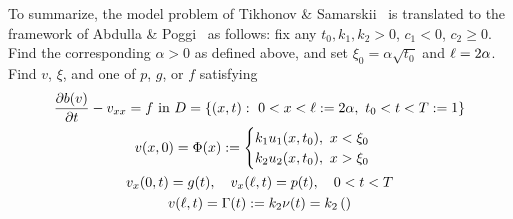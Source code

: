 To summarize, the model problem of Tikhonov \& Samarskii~\cite[Ch.\ II, App.\
IV, pp.\ 283--288]{tikhonov63} is translated to the framework of Abdulla \&
Poggi~\cite{abdulla16a} as follows: fix any \(t_0, k_1, k_2>0\), \(c_1<0\),
\(c_2 \geq 0\).
Find the corresponding \(\alpha>0\) as defined above, and set \(\xi_0 = \alpha
\sqrt{t_0}\) and \(\ell=2\alpha\).
Find \(v\), \(\xi{}\), and one of \(p\), \(g\), or \(f\) satisfying
\begin{gather}
  \frac{\partial{} b(v)}{\partial{} t} - v_{xx}
  = f~\text{in}~
  D=\left\{ (x,t):~0<x<\ell:=2\alpha,~t_0 < t < T:=1 \right\}\label{eq:tikhonov-samarskii-pde}
  \\
  v(x,0)
  = \Phi(x)
  :=\begin{cases}
    k_1 u_1(x,t_0),~x < \xi_0
    \\
    k_2 u_2(x,t_0),~x > \xi_0
  \end{cases}
  \\
  v_x(0,t) = g(t),\quad
  v_x(\ell, t) = p(t),\quad 0<t<T\label{eq:tikhonov-samarskii-neumann-conditions}
  \\
  v(\ell, t) = \Gamma(t) := k_2 \nu(t) = k_2 \left(
  \right)\label{eq:tikhonov-samarskii-extra-measurement}
\end{gather}

